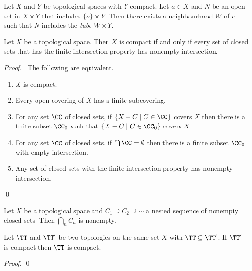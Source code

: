 \begin{corollary}
    Let $X$ and $Y$ be topological spaces with $Y$ compact. Let $a \in X$
    and $N$ be an open set in $X \times Y$ that includes $\{a\} \times Y$.
    Then there exists a neighbourhood $W$ of $a$ such that
    $N$ includes the \emph{tube} $W \times Y$.
\end{corollary}

\begin{theorem}
    \label{theorem:compact_closed_sets}
    Let $X$ be a topological space. Then $X$ is compact if and only if every set of closed sets that has the finite intersection property has nonempty intersection.
\end{theorem}

\begin{proof}
    \pf\ The following are equivalent.
    \begin{enumerate}
        \item $X$ is compact.
        \item Every open covering of $X$ has a finite subcovering.
        \item For any set $\CC$ of closed sets, if $\{ X - C \mid C \in \CC \}$ covers $X$ then there is a finite subset $\CC_0$ such that
        $\{ X - C \mid C \in \CC_0 \}$ covers $X$
        \item For any set $\CC$ of closed sets, if $\bigcap \CC = \emptyset$ then there is a finite subset $\CC_0$ with empty intersection.
        \item Any set of closed sets with the finite intersection property has nonempty intersection.
    \end{enumerate}
    \qed
\end{proof}

\begin{corollary}
    \label{corollary:nested_intersection}
    Let $X$ be a topological space and $C_1 \supseteq C_2 \supseteq \cdots$ a nested sequence of nonempty closed sets. Then $\bigcap_n C_n$ is nonempty.
\end{corollary}

\begin{proposition}
    Let $\TT$ and $\TT'$ be two topologies on the same set $X$ with $\TT \subseteq \TT'$. If $\TT'$ is compact then $\TT$ is compact.
\end{proposition}

\begin{proof}
    \pf
    \qed
\end{proof}

